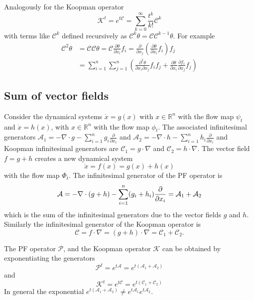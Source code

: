 \documentclass[pdflatex,sn-mathphys]{sn-jnl}%
\renewcommand{\P}{\mathcal{P}}
\newcommand{\C}{\mathcal{C}}
\newcommand{\K}{\mathcal{K}}
\theoremstyle{thmstyleone}%
\theoremstyle{thmstyletwo}%
\theoremstyle{thmstylethree}%
\begin{document}
Analogously for the Koopman operator
\begin{equation}\label{eq:k_exp}
    \mathcal{K}^t = e^{t\mathcal{C}} = \sum_{k=0}^{\infty} \frac{t^k}{k!}\mathcal{C}^k
\end{equation}
with terms like $\mathcal{C}^k$ defined recursively as $\mathcal{C}^k \theta = \mathcal{C} \mathcal{C}^{k-1} \theta$. For example
\[\begin{split}
\mathcal{C}^2 \theta &= \mathcal{C} \mathcal{C} \theta = \mathcal{C} \frac{\partial \theta}{\partial x_i} f_i = \frac{\partial }{\partial x_j} \left(\frac{\partial \theta}{\partial x_i} f_i\right) f_j\\
&= \sum_{i=1}^n\sum_{j=1}^n \left( \frac{\partial^2 \theta}{\partial x_i \partial x_j} f_i f_j + \frac{\partial \theta}{\partial x_i}\frac{\partial f_i}{\partial x_j} f_j \right)
\end{split}
\]


\subsection{Sum of vector fields}
Consider the dynamical systems $ \dot{x} = g(x)$ with $x \in \mathbb{R}^n$
with the flow map $\psi_t$ and  $\dot{x} = h(x)$, with $ x \in \mathbb{R}^n$ with the flow map $\phi_t$. The associated infinitesimal generators $\mathcal{A}_1 = -\nabla \cdot g -\sum_{i=1}^n g_i\frac{\partial}{\partial x_i}$  and $\mathcal{A}_2=-\nabla \cdot h -\sum_{i=1}^n h_i\frac{\partial}{\partial x_i}$ and Koopman infinitesimal generators are $\C_1 = g \cdot \nabla $ and $\C_2 = h \cdot \nabla$.
The vector field $f = g+h$ creates a new dynamical system 
\begin{equation}\label{eq:sum}
\dot{x} = f(x) = g(x) + h(x)
\end{equation}
with the flow map $\Phi_t$. The infinitesimal generator of the PF operator is
\begin{equation}\label{eq:sumA}
     \mathcal{A} = -\nabla \cdot(g+h)-\sum_{i=1}^n (g_i+h_i)\frac{\partial }{\partial x_i} \\
     = \mathcal{A}_1 + \mathcal{A}_2
\end{equation}
which is the sum of the infinitesimal generators due to the vector fields $g$ and $h$. Similarly the infinitesimal generator of the Koopman operator is
\begin{equation}\label{eq:sumC}
\C = f \cdot \nabla = (g+h) \cdot \nabla = \C_1 + \C_2.
\end{equation}

The PF  operator $\P$, and the Koopman operator $\K$  can be obtained by exponentiating the generators
\begin{equation}\label{eq:PFsum}
    \P^t = e^{t\mathcal{A}}= e^{t(\mathcal{A}_1+\mathcal{A}_2)}
\end{equation}
and
\begin{equation}\label{eq:Ksum}
    \K^t = e^{t\mathcal{C}}= e^{t(\mathcal{C}_1+\mathcal{C}_2)}
\end{equation}
In general the exponential $e^{t(\mathcal{A}_1+\mathcal{A}_2)} \neq e^{t\mathcal{A}_1}e^{t\mathcal{A}_2}$. 
\end{document}
